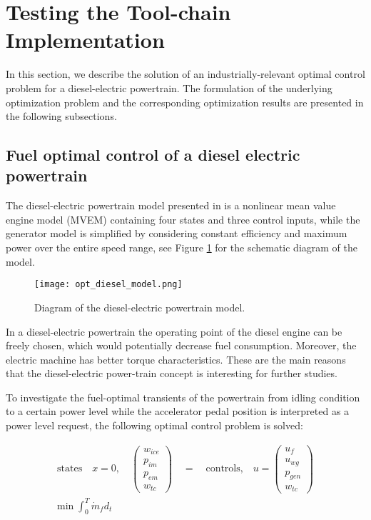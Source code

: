 \section{Testing the Tool-chain Implementation}
\label{sec:optimizationtesting}

In this section, we describe the solution of an industrially-relevant optimal control problem for a diesel-electric powertrain. The
formulation of the underlying optimization problem and the corresponding optimization results are presented in the
following subsections.

\subsection{Fuel optimal control of a diesel electric powertrain}
\label{sec:optimizationdiesel}

The diesel-electric powertrain model presented in \cite{sivertsson,bernhard} is a nonlinear
mean value engine model (MVEM) containing four states and three control inputs, while the generator model is
simplified by considering constant efficiency and maximum power over the entire speed range, see Figure \ref{fig:dieselmodel} for the
schematic diagram of the model.

\begin{figure}
	\texttt{[image: opt\_diesel\_model.png]}
	\caption{Diagram of the diesel-electric powertrain model.}
	\label{fig:dieselmodel}
\end{figure}

In a diesel-electric powertrain the operating point of the diesel engine can be freely chosen, which would potentially
decrease fuel consumption. Moreover, the electric machine has better torque characteristics. These are the main reasons
that the diesel-electric power-train concept is interesting for further studies.

To investigate the fuel-optimal transients of the powertrain from idling condition to a certain power level while the
accelerator pedal position is interpreted as a power level request, the following optimal control problem is solved:

\begin{equation*}
 \begin{aligned}
	\text{states}\quad x = 0, \quad \begin{pmatrix} w_{ice} \\ p_{im} \\p_{em} \\w_{tc}  \end{pmatrix}\quad = \quad \text{controls,}\quad u = \begin{pmatrix} u_{f} \\ u_{wg} \\p_{gen} \\w_{tc}  \end{pmatrix} \\
	\text{min}\;\int_{0}^{T}\dot{m}{_f} d_t
\end{aligned}
\end{equation*}

